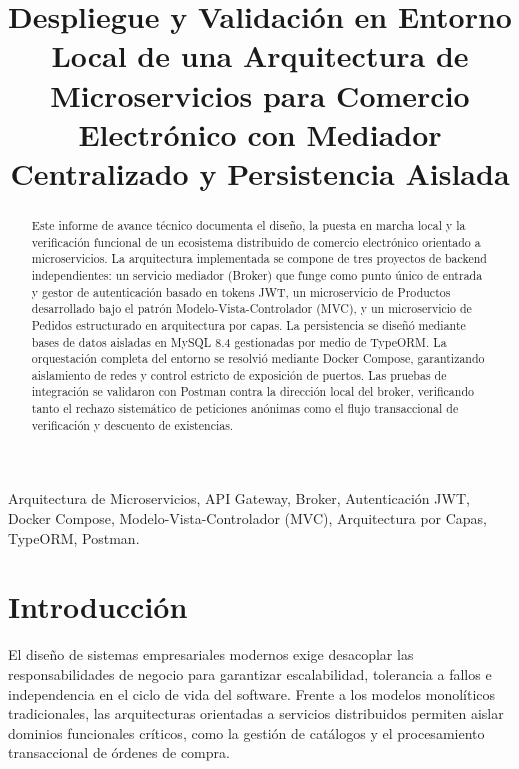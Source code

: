 \documentclass[conference]{IEEEtran}
\begin{document}
\title{Despliegue y Validación en Entorno Local de una Arquitectura de Microservicios para Comercio Electrónico con Mediador Centralizado y Persistencia Aislada}

\author{
\and
{}
}

\maketitle

\begin{abstract}
Este informe de avance técnico documenta el diseño, la puesta en marcha local y la verificación funcional de un ecosistema distribuido de comercio electrónico orientado a microservicios. La arquitectura implementada se compone de tres proyectos de backend independientes: un servicio mediador (Broker) que funge como punto único de entrada y gestor de autenticación basado en tokens JWT, un microservicio de Productos desarrollado bajo el patrón Modelo-Vista-Controlador (MVC), y un microservicio de Pedidos estructurado en arquitectura por capas. La persistencia se diseñó mediante bases de datos aisladas en MySQL 8.4 gestionadas por medio de TypeORM. La orquestación completa del entorno se resolvió mediante Docker Compose, garantizando aislamiento de redes y control estricto de exposición de puertos. Las pruebas de integración se validaron con Postman contra la dirección local del broker, verificando tanto el rechazo sistemático de peticiones anónimas como el flujo transaccional de verificación y descuento de existencias.
\end{abstract}

\begin{IEEEkeywords}
Arquitectura de Microservicios, API Gateway, Broker, Autenticación JWT, Docker Compose, Modelo-Vista-Controlador (MVC), Arquitectura por Capas, TypeORM, Postman.
\end{IEEEkeywords}

\section{Introducción}
El diseño de sistemas empresariales modernos exige desacoplar las responsabilidades de negocio para garantizar escalabilidad, tolerancia a fallos e independencia en el ciclo de vida del software. Frente a los modelos monolíticos tradicionales, las arquitecturas orientadas a servicios distribuidos permiten aislar dominios funcionales críticos, como la gestión de catálogos y el procesamiento transaccional de órdenes de compra.
\end{document}
